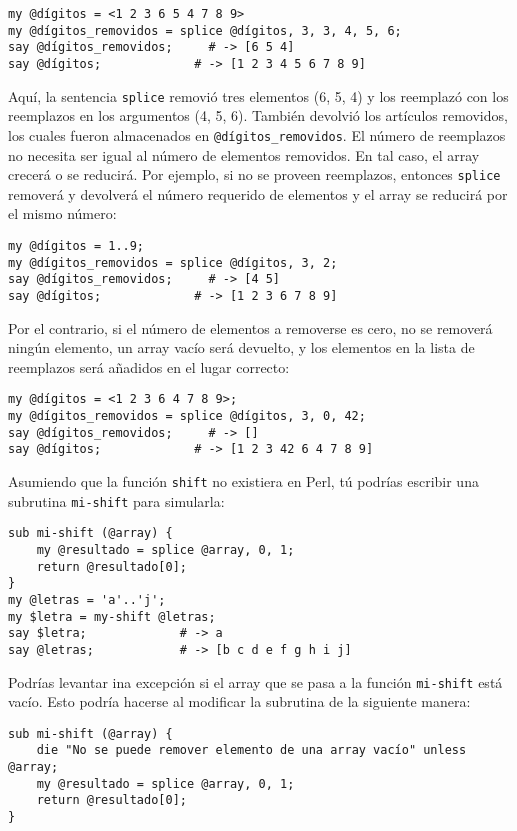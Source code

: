 \begin{verbatim}
my @dígitos = <1 2 3 6 5 4 7 8 9>
my @dígitos_removidos = splice @dígitos, 3, 3, 4, 5, 6;
say @dígitos_removidos;     # -> [6 5 4]
say @dígitos;             # -> [1 2 3 4 5 6 7 8 9]
\end{verbatim}
%
Aquí, la sentencia {\tt splice} removió tres elementos (6, 5, 4)
y los reemplazó con los reemplazos en los argumentos (4, 5, 6).
También devolvió los artículos removidos, los cuales
fueron almacenados en \verb|@dígitos_removidos|.
El número de reemplazos no necesita ser igual al número de elementos
removidos. En tal caso, el array crecerá o se reducirá. Por ejemplo,
si no se proveen reemplazos, entonces {\tt splice} removerá y devolverá
el número requerido de elementos y el array se reducirá por el
mismo número:

\begin{verbatim}
my @dígitos = 1..9;
my @dígitos_removidos = splice @dígitos, 3, 2;
say @dígitos_removidos;     # -> [4 5]
say @dígitos;             # -> [1 2 3 6 7 8 9]
\end{verbatim}
%

Por el contrario, si el número de elementos a removerse es
cero, no se removerá ningún elemento, un array vacío será
devuelto, y los elementos en la lista de reemplazos será
añadidos en el lugar correcto:

\begin{verbatim}
my @dígitos = <1 2 3 6 4 7 8 9>;
my @dígitos_removidos = splice @dígitos, 3, 0, 42;
say @dígitos_removidos;     # -> []
say @dígitos;             # -> [1 2 3 42 6 4 7 8 9]
\end{verbatim}
%

Asumiendo que la función {\tt shift} no existiera en Perl,
tú podrías escribir una subrutina {\tt mi-shift} para 
simularla:

\begin{verbatim}
sub mi-shift (@array) {
    my @resultado = splice @array, 0, 1;
    return @resultado[0];
}
my @letras = 'a'..'j';
my $letra = my-shift @letras;
say $letra;             # -> a
say @letras;            # -> [b c d e f g h i j]
\end{verbatim}

Podrías levantar ina excepción si el array que se
pasa a la función {\tt mi-shift} está vacío. Esto
podría hacerse al modificar la subrutina de la siguiente
manera:

\begin{verbatim}
sub mi-shift (@array) {
    die "No se puede remover elemento de una array vacío" unless @array;
    my @resultado = splice @array, 0, 1;
    return @resultado[0];
}
\end{verbatim}
%

